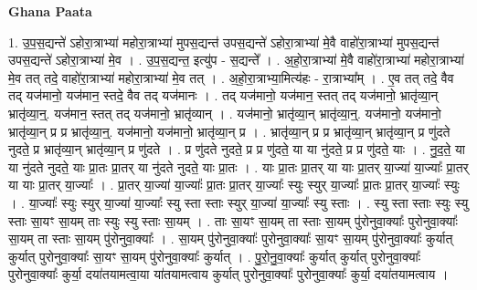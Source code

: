 \documentclass[17pt]{extarticle}
\begin{document}
\textbf{Ghana Paata } \newline

1. उ॒प॒स॒द्यन्ते॑ ऽहोरा॒त्राभ्या॑ महोरा॒त्राभ्या॑ मुपस॒द्यन्त॑ उपस॒द्यन्ते॑ ऽहोरा॒त्राभ्या॑ मे॒वै वाहो॑रा॒त्राभ्या॑ मुपस॒द्यन्त॑ उपस॒द्यन्ते॑ ऽहोरा॒त्राभ्या॑ मे॒व । . उ॒प॒स॒द्यन्त॒ इत्यु॑प - स॒द्यन्ते᳚ । . अ॒हो॒रा॒त्राभ्या॑ मे॒वै वाहो॑रा॒त्राभ्या॑ महोरा॒त्राभ्या॑ मे॒व तत् तदे॒ वाहो॑रा॒त्राभ्या॑ महोरा॒त्राभ्या॑ मे॒व तत् । . अ॒हो॒रा॒त्राभ्या॒मित्य॑हः - रा॒त्राभ्या᳚म् । . ए॒व तत् तदे॒ वैव तद् यज॑मानो॒ यज॑मान॒ स्तदे॒ वैव तद् यज॑मानः । . तद् यज॑मानो॒ यज॑मान॒ स्तत् तद् यज॑मानो॒ भ्रातृ॑व्या॒न् भ्रातृ॑व्या॒न्॒. यज॑मान॒ स्तत् तद् यज॑मानो॒ भ्रातृ॑व्यान् । . यज॑मानो॒ भ्रातृ॑व्या॒न् भ्रातृ॑व्या॒न्॒. यज॑मानो॒ यज॑मानो॒ भ्रातृ॑व्या॒न् प्र प्र भ्रातृ॑व्या॒न्॒. यज॑मानो॒ यज॑मानो॒ भ्रातृ॑व्या॒न् प्र । . भ्रातृ॑व्या॒न् प्र प्र भ्रातृ॑व्या॒न् भ्रातृ॑व्या॒न् प्र णु॑दते नुदते॒ प्र भ्रातृ॑व्या॒न् भ्रातृ॑व्या॒न् प्र णु॑दते । . प्र णु॑दते नुदते॒ प्र प्र णु॑दते॒ या या नु॑दते॒ प्र प्र णु॑दते॒ याः । . नु॒द॒ते॒ या या नु॑दते नुदते॒ याः प्रा॒तः प्रा॒तर् या नु॑दते नुदते॒ याः प्रा॒तः । . याः प्रा॒तः प्रा॒तर् या याः प्रा॒तर् या॒ज्या॑ या॒ज्याः᳚ प्रा॒तर् या याः प्रा॒तर् या॒ज्याः᳚ । . प्रा॒तर् या॒ज्या॑ या॒ज्याः᳚ प्रा॒तः प्रा॒तर् या॒ज्याः᳚ स्युः स्युर् या॒ज्याः᳚ प्रा॒तः प्रा॒तर् या॒ज्याः᳚ स्युः । . या॒ज्याः᳚ स्युः स्युर् या॒ज्या॑ या॒ज्याः᳚ स्यु स्ता स्ताः स्युर् या॒ज्या॑ या॒ज्याः᳚ स्यु स्ताः । . स्यु स्ता स्ताः स्युः स्यु स्ताः सा॒यꣳ सा॒यम् ताः स्युः स्यु स्ताः सा॒यम् । . ताः सा॒यꣳ सा॒यम् ता स्ताः सा॒यम् पु॑रोनुवा॒क्याः᳚ पुरोनुवा॒क्याः᳚ सा॒यम् ता स्ताः सा॒यम् पु॑रोनुवा॒क्याः᳚ । . सा॒यम् पु॑रोनुवा॒क्याः᳚ पुरोनुवा॒क्याः᳚ सा॒यꣳ सा॒यम् पु॑रोनुवा॒क्याः᳚ कुर्यात् कुर्यात् पुरोनुवा॒क्याः᳚ सा॒यꣳ सा॒यम् पु॑रोनुवा॒क्याः᳚ कुर्यात् । . पु॒रो॒नु॒वा॒क्याः᳚ कुर्यात् कुर्यात् पुरोनुवा॒क्याः᳚ पुरोनुवा॒क्याः᳚ कुर्या॒ दया॑तयामत्वा॒या या॑तयामत्वाय कुर्यात् पुरोनुवा॒क्याः᳚ पुरोनुवा॒क्याः᳚ कुर्या॒ दया॑तयामत्वाय । \newline
\end{document}

